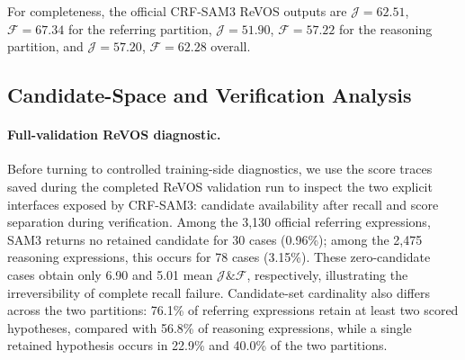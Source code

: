 \begin{table}[t]
\centering
\setlength{\tabcolsep}{3.8pt}
\renewcommand{\arraystretch}{1.08}
\caption{Representative comparison on the complete ReVOS validation run. Ref. and Reason. denote the official referring and reasoning partitions; Overall is the official evaluator output.}
\label{tab:revos_results}
\end{table}

For completeness, the official CRF-SAM3 ReVOS outputs are $\mathcal{J}=62.51$, $\mathcal{F}=67.34$ for the referring partition, $\mathcal{J}=51.90$, $\mathcal{F}=57.22$ for the reasoning partition, and $\mathcal{J}=57.20$, $\mathcal{F}=62.28$ overall.

\subsection{Candidate-Space and Verification Analysis}
\paragraph{Full-validation ReVOS diagnostic.}
Before turning to controlled training-side diagnostics, we use the score traces saved during the completed ReVOS validation run to inspect the two explicit interfaces exposed by CRF-SAM3: candidate availability after recall and score separation during verification. Among the 3,130 official referring expressions, SAM3 returns no retained candidate for 30 cases (0.96\%); among the 2,475 reasoning expressions, this occurs for 78 cases (3.15\%). These zero-candidate cases obtain only 6.90 and 5.01 mean $\mathcal{J}\&\mathcal{F}$, respectively, illustrating the irreversibility of complete recall failure. Candidate-set cardinality also differs across the two partitions: 76.1\% of referring expressions retain at least two scored hypotheses, compared with 56.8\% of reasoning expressions, while a single retained hypothesis occurs in 22.9\% and 40.0\% of the two partitions.

